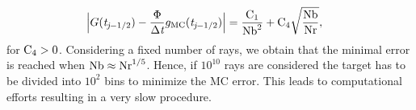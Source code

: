 \begin{equation} \begin{aligned}
\Big|G(\textit{t}_{\textit{j}-1/2})&-\frac{\Phi}
{\Delta\textit{t}}g_{\textrm{MC}}(\textit{t}_{\textit{j}-1/2})\Big| =
\frac{\textrm{C}_1}{\textrm{Nb}^2} + \textrm{C}_4\sqrt{\frac{\textrm{Nb}}{\textrm{Nr}}},
\end{aligned}
\end{equation}
for $\textrm{C}_4>0$.
Considering a fixed number of rays, we obtain that the minimal error is reached when $\textrm{Nb}\approx \textrm{Nr}^{1/5}$.
Hence, if $10^{10}$ rays are considered the target has to be divided into $10^2$ bins to minimize the MC error.
This leads to computational efforts resulting in a very slow procedure.



%
%
